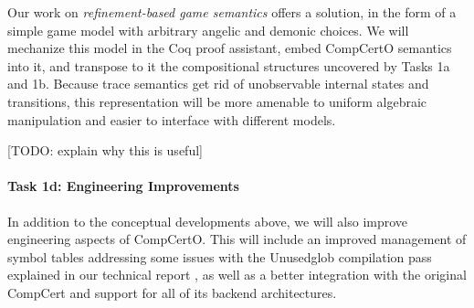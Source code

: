 Our work on \emph{refinement-based game semantics} \cite{koenig20}
offers a solution,
in the form of a simple game model
with arbitrary angelic and demonic choices.
We will mechanize this model in the Coq proof assistant,
embed CompCertO semantics into it,
and transpose to it the compositional structures uncovered by Tasks 1a and 1b.
Because trace semantics
get rid of unobservable internal states and transitions,
this representation will be more amenable to uniform algebraic manipulation
and easier to interface with different models.

[TODO: explain why this is useful]

\vspace*{-2ex}
\paragraph*{Task 1d: Engineering Improvements}

In addition to the conceptual developments above,
we will also improve engineering aspects of CompCertO.
This will include an improved management of symbol tables
addressing some issues with the \textsf{Unusedglob} compilation pass
explained in our technical report \cite[\S{}A.3]{compcerto21tr},
as well as a better integration with the original CompCert
and support for all of its backend architectures.


